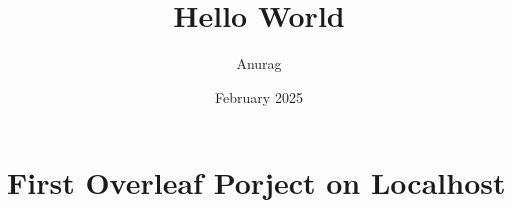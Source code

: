 \documentclass{article}
\title{Hello World}
\author{Anurag}
\date{February 2025}
\begin{document}
\maketitle

\section{First Overleaf Porject on Localhost}
\end{document}
